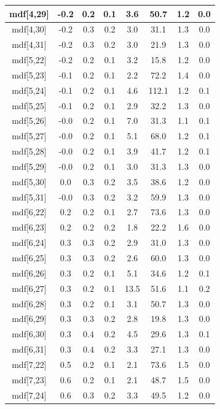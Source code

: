 \begin{longtable}{|c|c|c|c|c|c|c|c|}
\hline
mdf[4,29] & -0.2 & 0.2 & 0.1 & 3.6 & 50.7 & 1.2 & 0.0 \\
\hline
mdf[4,30] & -0.2 & 0.3 & 0.2 & 3.0 & 31.1 & 1.3 & 0.0 \\
\hline
mdf[4,31] & -0.2 & 0.3 & 0.2 & 3.0 & 21.9 & 1.3 & 0.0 \\
\hline
mdf[5,22] & -0.2 & 0.2 & 0.1 & 3.2 & 15.8 & 1.2 & 0.0 \\
\hline
mdf[5,23] & -0.1 & 0.2 & 0.1 & 2.2 & 72.2 & 1.4 & 0.0 \\
\hline
mdf[5,24] & -0.1 & 0.2 & 0.1 & 4.6 & 112.1 & 1.2 & 0.1 \\
\hline
mdf[5,25] & -0.1 & 0.2 & 0.1 & 2.9 & 32.2 & 1.3 & 0.0 \\
\hline
mdf[5,26] & -0.0 & 0.2 & 0.1 & 7.0 & 31.3 & 1.1 & 0.1 \\
\hline
mdf[5,27] & -0.0 & 0.2 & 0.1 & 5.1 & 68.0 & 1.2 & 0.1 \\
\hline
mdf[5,28] & -0.0 & 0.2 & 0.1 & 3.9 & 41.7 & 1.2 & 0.1 \\
\hline
mdf[5,29] & -0.0 & 0.2 & 0.1 & 3.0 & 31.3 & 1.3 & 0.0 \\
\hline
mdf[5,30] & 0.0 & 0.3 & 0.2 & 3.5 & 38.6 & 1.2 & 0.0 \\
\hline
mdf[5,31] & -0.0 & 0.3 & 0.2 & 3.2 & 59.9 & 1.3 & 0.0 \\
\hline
mdf[6,22] & 0.2 & 0.2 & 0.1 & 2.7 & 73.6 & 1.3 & 0.0 \\
\hline
mdf[6,23] & 0.2 & 0.2 & 0.2 & 1.8 & 22.2 & 1.6 & 0.0 \\
\hline
mdf[6,24] & 0.3 & 0.3 & 0.2 & 2.9 & 31.0 & 1.3 & 0.0 \\
\hline
mdf[6,25] & 0.3 & 0.3 & 0.2 & 2.6 & 60.0 & 1.3 & 0.0 \\
\hline
mdf[6,26] & 0.3 & 0.2 & 0.1 & 5.1 & 34.6 & 1.2 & 0.1 \\
\hline
mdf[6,27] & 0.3 & 0.2 & 0.1 & 13.5 & 51.6 & 1.1 & 0.2 \\
\hline
mdf[6,28] & 0.3 & 0.2 & 0.1 & 3.1 & 50.7 & 1.3 & 0.0 \\
\hline
mdf[6,29] & 0.3 & 0.3 & 0.2 & 2.8 & 19.8 & 1.3 & 0.0 \\
\hline
mdf[6,30] & 0.3 & 0.4 & 0.2 & 4.5 & 29.6 & 1.3 & 0.1 \\
\hline
mdf[6,31] & 0.3 & 0.4 & 0.2 & 3.3 & 27.1 & 1.3 & 0.0 \\
\hline
mdf[7,22] & 0.5 & 0.2 & 0.1 & 2.1 & 73.6 & 1.5 & 0.0 \\
\hline
mdf[7,23] & 0.6 & 0.2 & 0.1 & 2.1 & 48.7 & 1.5 & 0.0 \\
\hline
mdf[7,24] & 0.6 & 0.3 & 0.2 & 3.3 & 49.5 & 1.2 & 0.0 \\

\end{longtable}
